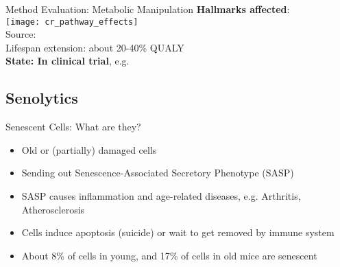 % 
% 


\begin{frame}[c]{Method Evaluation: Metabolic Manipulation}
    \textbf{Hallmarks affected}: \\
    \texttt{[image: cr\_pathway\_effects]} \\
    Source: \cite{erbaba2020effects} \\
    \pause
    Lifespan extension: about 20-40\% QUALY \cite{swindell2012dietary} \\
    \pause
    \textbf{State: In clinical trial}, e.g. \cite{TAMETarg47:online}
\end{frame}


\subsection{Senolytics}

\begin{frame}[c]{Senescent Cells: What are they?}
    \large
    \begin{itemize}[<+(1)->]
        \item Old or (partially) damaged cells
        \item Sending out Senescence-Associated Secretory Phenotype (SASP)
        \item SASP causes inflammation and age-related diseases, e.g. Arthritis, Atherosclerosis
        \item Cells induce apoptosis (suicide) or wait to get removed by immune system
        \item About 8\% of cells in young, and 17\% of cells in old mice are senescent \cite{folgueras2018mouse}
    \end{itemize}
\end{frame}

